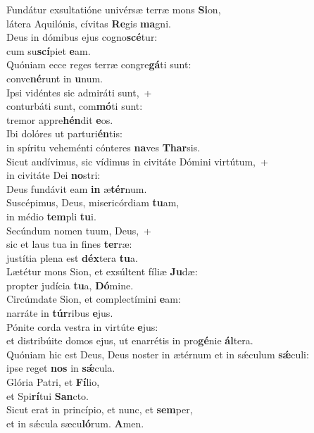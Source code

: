 \evenverse Fundátur exsultatióne univérsæ terræ mons \textbf{Si}on,~\*\\
\evenverse látera Aquilónis, cívitas \textbf{Re}gis \textbf{ma}gni.\\
\oddverse Deus in dómibus ejus cogno\textbf{scé}tur:~\*\\
\oddverse cum su\textbf{scí}piet \textbf{e}am.\\
\evenverse Quóniam ecce reges terræ congre\textbf{gá}ti sunt:~\*\\
\evenverse conve\textbf{né}runt in \textbf{u}num.\\
\oddverse Ipsi vidéntes sic admiráti sunt,~+\\
\oddverse  conturbáti sunt, com\textbf{mó}ti sunt:~\*\\
\oddverse tremor appre\textbf{hén}dit \textbf{e}os.\\
\evenverse Ibi dolóres ut parturi\textbf{én}tis:~\*\\
\evenverse in spíritu veheménti cónteres \textbf{na}ves \textbf{Thar}sis.\\
\oddverse Sicut audívimus, sic vídimus in civitáte Dómini virtútum,~+\\
\oddverse  in civitáte Dei \textbf{no}stri:~\*\\
\oddverse Deus fundávit eam \textbf{in} æ\textbf{tér}num.\\
\evenverse Suscépimus, Deus, misericórdiam \textbf{tu}am,~\*\\
\evenverse in médio \textbf{tem}pli \textbf{tu}i.\\
\oddverse Secúndum nomen tuum, Deus,~+\\
\oddverse  sic et laus tua in fines \textbf{ter}ræ:~\*\\
\oddverse justítia plena est \textbf{déx}tera \textbf{tu}a.\\
\evenverse Lætétur mons Sion, et exsúltent fíliæ \textbf{Ju}dæ:~\*\\
\evenverse propter judícia \textbf{tu}a, \textbf{Dó}mine.\\
\oddverse Circúmdate Sion, et complectímini \textbf{e}am:~\*\\
\oddverse narráte in \textbf{túr}ribus \textbf{e}jus.\\
\evenverse Pónite corda vestra in virtúte \textbf{e}jus:~\*\\
\evenverse et distribúite domos ejus, ut enarrétis in pro\textbf{gé}nie \textbf{ál}tera.\\
\oddverse Quóniam hic est Deus, Deus noster in ætérnum et in sǽculum \textbf{sǽ}culi:~\*\\
\oddverse ipse reget \textbf{nos} in \textbf{sǽ}cula.\\
\evenverse Glória Patri, et \textbf{Fí}lio,~\*\\
\evenverse et Spi\textbf{rí}tui \textbf{San}cto.\\
\oddverse Sicut erat in princípio, et nunc, et \textbf{sem}per,~\*\\
\oddverse et in sǽcula sæcu\textbf{ló}rum. \textbf{A}men.\\
